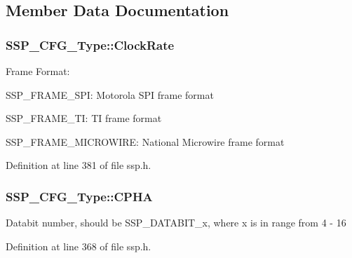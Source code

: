 \subsection{Member Data Documentation}
\subsubsection[{\texorpdfstring{Clock\+Rate}{ClockRate}}]{ S\+S\+P\+\_\+\+C\+F\+G\+\_\+\+Type\+::\+Clock\+Rate}\hypertarget{struct_s_s_p___c_f_g___type_a00f744e032746b5b107556a9d7094c4a}{}\label{struct_s_s_p___c_f_g___type_a00f744e032746b5b107556a9d7094c4a}
Frame Format\+:
\begin{DoxyItemize}
\item S\+S\+P\+\_\+\+F\+R\+A\+M\+E\+\_\+\+S\+PI\+: Motorola S\+PI frame format
\item S\+S\+P\+\_\+\+F\+R\+A\+M\+E\+\_\+\+TI\+: TI frame format
\item S\+S\+P\+\_\+\+F\+R\+A\+M\+E\+\_\+\+M\+I\+C\+R\+O\+W\+I\+RE\+: National Microwire frame format 
\end{DoxyItemize}

Definition at line 381 of file ssp.\+h.

\subsubsection[{\texorpdfstring{C\+P\+HA}{CPHA}}]{ S\+S\+P\+\_\+\+C\+F\+G\+\_\+\+Type\+::\+C\+P\+HA}\hypertarget{struct_s_s_p___c_f_g___type_af34662ac679b1c7329ed644a749dd2da}{}\label{struct_s_s_p___c_f_g___type_af34662ac679b1c7329ed644a749dd2da}
Databit number, should be S\+S\+P\+\_\+\+D\+A\+T\+A\+B\+I\+T\+\_\+x, where x is in range from 4 -\/ 16 

Definition at line 368 of file ssp.\+h.

